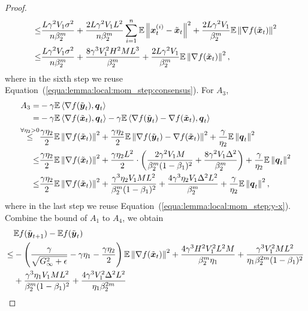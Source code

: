 \begin{proof}
\begin{align*}
    \leq & \frac{L\gamma^2V_1\sigma^2}{n\beta_2^m} + \frac{2L\gamma^2V_1L^2}{n\beta_2^m}\sum_{i=1}^{n}\mathbb E\left\| \boldsymbol{x}_t^{(i)} - \tilde{\boldsymbol{x}}_t\right\|^2 + \frac{2L\gamma^2V_1}{\beta_2^m}\mathbb E\left\| \nabla f(\tilde{\boldsymbol{x}}_t)\right\|^2 \\
\leq & \frac{L\gamma^2V_1\sigma^2}{n\beta_2^m} + \frac{8\gamma^3V_1^2H^2ML^3}{\beta_2^m} + \frac{2L\gamma^2V_1}{\beta_2^m}\mathbb E\left\| \nabla f(\tilde{\boldsymbol{x}}_t)\right\|^2,
\end{align*}
where in the sixth step we reuse Equation~(\ref{equa:lemma:local:mom_step:consensus}).
For $A_3$,
\begin{align*}
    A_3 = & -\gamma\mathbb{E}\left\langle \nabla f(\tilde{\boldsymbol{y}}_t), \boldsymbol{q}_t \right\rangle \\
= & -\gamma\mathbb{E}\left\langle \nabla f(\tilde{\boldsymbol{x}}_t), \boldsymbol{q}_t \right\rangle - \gamma\mathbb{E}\left\langle \nabla f(\tilde{\boldsymbol{y}}_t) - \nabla f(\tilde{\boldsymbol{x}}_t), \boldsymbol{q}_t \right\rangle \\
    \overset{\forall\eta_2>0}{\leq} & \frac{\gamma\eta_2}{2}\mathbb{E}\left\| \nabla f(\tilde{\boldsymbol{x}}_t)\right\|^2 + \frac{\gamma\eta_2}{2}\mathbb{E}\left\| \nabla f(\tilde{\boldsymbol{y}}_t) - \nabla f(\tilde{\boldsymbol{x}}_t)\right\|^2 + \frac{\gamma}{\eta_2}\mathbb{E}\left\| \boldsymbol{q}_t\right\|^2 \\
\leq & \frac{\gamma\eta_2}{2}\mathbb{E}\left\| \nabla f(\tilde{\boldsymbol{x}}_t)\right\|^2 + \frac{\gamma\eta_2L^2}{2}\cdot \left( \frac{2\gamma^2V_1M}{\beta_2^m(1-\beta_1)^2} + \frac{8\gamma^2V_1\Delta^2}{\beta_2^m}\right) + \frac{\gamma}{\eta_2}\mathbb{E}\left\| \boldsymbol{q}_t\right\|^2 \\
    \leq & \frac{\gamma\eta_2}{2}\mathbb{E}\left\| \nabla f(\tilde{\boldsymbol{x}}_t)\right\|^2 + \frac{\gamma^3\eta_2V_1ML^2}{\beta_2^m(1-\beta_1)^2} + \frac{4\gamma^3\eta_2V_1\Delta^2L^2}{\beta_2^m} + \frac{\gamma}{\eta_2}\mathbb{E}\left\| \boldsymbol{q}_t\right\|^2,
\end{align*}
where in the last step we reuse Equation~(\ref{equa:lemma:local:mom_step:y-x}).
Combine the bound of $A_1$ to $A_4$, we obtain
\begin{align*}
    & \mathbb E f(\tilde{\*{y}}_{t+1}) - \mathbb Ef(\tilde{\*{y}}_{t}) \\
\leq & -\left( \frac{\gamma}{\sqrt{G_\infty^2+\epsilon}} - \gamma\eta_1 - \frac{\gamma\eta_2}{2} \right)\mathbb E\left\| \nabla f(\tilde{\*{x}}_t) \right\|^2
    + \frac{4\gamma^3H^2V_1^2L^2M}{\beta_2^m\eta_1} + \frac{\gamma^3V_1^2ML^2}{\eta_1\beta_2^{2m}(1-\beta_1)^2} \\
    & + \frac{\gamma^3\eta_1V_1ML^2}{\beta_2^m(1-\beta_1)^2} + \frac{4\gamma^3V_1^2\Delta^2L^2}{\eta_1\beta_2^{2m}}\\

\end{align*}
\end{proof}
